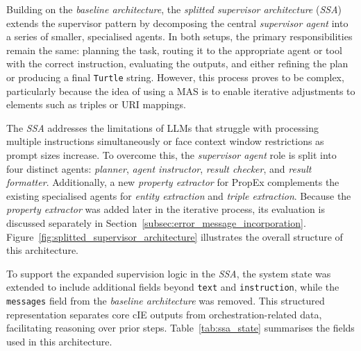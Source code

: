 \documentclass[a4paper,oneside,bibliography=totoc]{scrbook}
\begin{document}
Building on the \textit{baseline architecture}, the \textit{splitted supervisor architecture} (\textit{\ac{SSA}}) extends the supervisor pattern by decomposing the central \textit{supervisor agent} into a series of smaller, specialised agents. In both setups, the primary responsibilities remain the same: planning the task, routing it to the appropriate agent or tool with the correct instruction, evaluating the outputs, and either refining the plan or producing a final \texttt{Turtle} string. However, this process proves to be complex, particularly because the idea of using a \ac{MAS} is to enable iterative adjustments to elements such as triples or \ac{URI} mappings.

The \textit{\ac{SSA}} addresses the limitations of \acp{LLM} that struggle with processing multiple instructions simultaneously or face context window restrictions as prompt sizes increase. To overcome this, the \textit{supervisor agent} role is split into four distinct agents: \textit{planner}, \textit{agent instructor}, \textit{result checker}, and \textit{result formatter}. Additionally, a new \textit{property extractor} for \ac{PropEx} complements the existing specialised agents for \textit{entity extraction} and \textit{triple extraction}. Because the \textit{property extractor} was added later in the iterative process, its evaluation is discussed separately in Section~\ref{subsec:error_message_incorporation}. Figure~\ref{fig:splitted_supervisor_architecture} illustrates the overall structure of this architecture.

To support the expanded supervision logic in the \textit{\ac{SSA}}, the system state was extended to include additional fields beyond \texttt{text} and \texttt{instruction}, while the \texttt{messages} field from the \textit{baseline architecture} was removed. This structured representation separates core \ac{cIE} outputs from orchestration-related data, facilitating reasoning over prior steps. Table~\ref{tab:ssa_state} summarises the fields used in this architecture.
\end{document}
